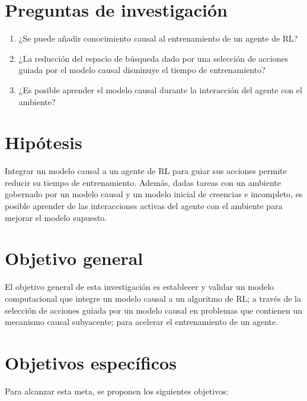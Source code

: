 
\section{Preguntas de investigación}

\begin{enumerate}
    \item ¿Se puede añadir conocimiento causal al entrenamiento de un agente de RL?
    \item ¿La reducción del espacio de búsqueda dado por una selección
    de acciones guiada por el modelo causal disminuye el tiempo de 
    entrenamiento?
    \item ¿Es posible aprender el modelo causal durante la interacción del
    agente con el ambiente?
\end{enumerate}
\section{Hipótesis}
Integrar un modelo causal a un agente de RL para guiar sus
    acciones permite reducir su tiempo de entrenamiento. Además, dadas
    tareas con un ambiente gobernado por un modelo
    causal y un modelo inicial de creencias e incompleto, es posible  aprender de las interacciones activas del agente con el ambiente
    para mejorar el modelo supuesto.
    
\section{Objetivo general}
El objetivo general de esta investigación
es establecer y validar un modelo computacional que integre 
un modelo causal a un algoritmo de RL; a través de
la selección de acciones guiada por un 
modelo causal en problemas que contienen
un mecanismo causal subyacente; para acelerar el entrenamiento de un agente.
\section{Objetivos específicos}

Para alcanzar esta meta, se proponen
los siguientes objetivos:

